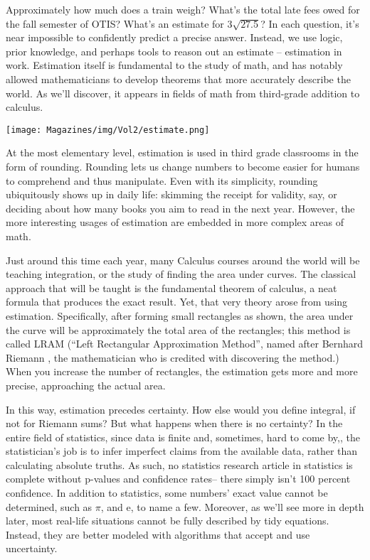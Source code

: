 \documentclass{article}
\begin{document}
\begin{multicols}{3}

Approximately how much does a train weigh? What’s the total late fees owed for the fall semester of OTIS? What’s an estimate for $3\sqrt{27.5}$? In each question, it’s near impossible to confidently predict a precise answer. Instead, we use logic, prior knowledge, and perhaps tools to reason out an estimate – estimation in work. Estimation itself is fundamental to the study of math, and has notably allowed mathematicians to develop theorems that more accurately describe the world. As we’ll discover, it appears in fields of math from third-grade addition to calculus.

\begin{center}
\texttt{[image: Magazines/img/Vol2/estimate.png]}
\end{center}

At the most elementary level, estimation is used in third grade classrooms in the form of rounding. Rounding lets us change numbers to become easier for humans to comprehend and thus manipulate. Even with its simplicity, rounding ubiquitously shows up in daily life: skimming the receipt for validity, say, or deciding about how many books you aim to read in the next year. However, the more interesting usages of estimation are embedded in more complex areas of math. 

Just around this time each year, many Calculus courses around the world will be teaching integration, or the study of finding the area under curves. The classical approach that will be taught is the fundamental theorem of calculus, a neat formula that produces the exact result. Yet, that very theory arose from using estimation. Specifically, after forming small rectangles as shown, the area under the curve will be approximately the total area of the rectangles; this method is called LRAM (“Left Rectangular Approximation Method”, named after Bernhard Riemann , the mathematician who is credited with discovering the method.) When you increase the number of rectangles, the estimation gets more and more precise, approaching the actual area.  

In this way, estimation precedes certainty. How else would you define integral, if not for Riemann sums? But what happens when there is no certainty? In the entire field of statistics, since data is finite and, sometimes, hard to come by,, the statistician’s job is to infer imperfect claims from the available data, rather than calculating absolute truths. As such, no statistics research article in statistics is complete without p-values and confidence rates– there simply isn’t 100 percent confidence. In addition to statistics, some numbers’ exact value cannot be determined, such as $\pi$, and e, to name a few. Moreover, as we’ll see more in depth later, most real-life situations cannot be fully described by tidy equations. Instead, they are better modeled with algorithms that accept and use uncertainty. 


\end{multicols}
\end{document}
